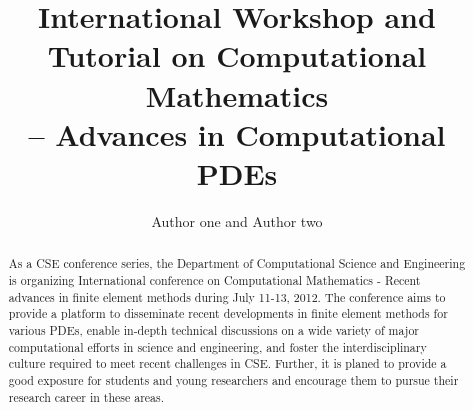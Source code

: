 \documentclass{amsart}
\begin{document}
\title{International Workshop and Tutorial on Computational Mathematics \\-- Advances in Computational PDEs}
\author{Author one and Author two}
\address[Author One]
{Department of Computational Science and Engineering, Yonsei
University, Seoul 120-749, Korea} 
\address[Author Two]
{Department of Computational Science and Engineering, Yonsei
University, Seoul 120-749, Korea} 

\begin{abstract}
As a CSE conference series, the Department of Computational Science
and Engineering is organizing International conference on
Computational Mathematics - Recent advances in finite element
methods during July 11-13, 2012. The conference aims to provide a
platform to disseminate recent developments in finite element
methods for various PDEs, enable in-depth technical discussions on a
wide variety of major computational efforts in science and
engineering, and foster the interdisciplinary culture required to
meet recent challenges in CSE. Further, it is planed to provide a
good exposure for students and young researchers and encourage them
to pursue their research career in these areas.
\end{abstract}

\maketitle
\end{document}
